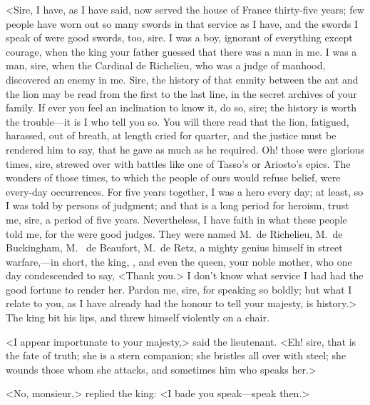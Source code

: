 <Sire, I have, as I have said, now served the house of France thirty-five years; few people have worn out so many swords in that service as I have, and the swords I speak of were good swords, too, sire. I was a boy, ignorant of everything except courage, when the king your father guessed that there was a man in me. I was a man, sire, when the Cardinal de Richelieu, who was a judge of manhood, discovered an enemy in me. Sire, the history of that enmity between the ant and the lion may be read from the first to the last line, in the secret archives of your family. If ever you feel an inclination to know it, do so, sire; the history is worth the trouble—it is I who tell you so. You will there read that the lion, fatigued, harassed, out of breath, at length cried for quarter, and the justice must be rendered him to say, that he gave as much as he required. Oh! those were glorious times, sire, strewed over with battles like one of Tasso's or Ariosto's epics. The wonders of those times, to which the people of ours would refuse belief, were every-day occurrences. For five years together, I was a hero every day; at least, so I was told by persons of judgment; and that is a long period for heroism, trust me, sire, a period of five years. Nevertheless, I have faith in what these people told me, for the were good judges. They were named M.~de Richelieu, M.~de Buckingham, M.~ de Beaufort, M.~de Retz, a mighty genius himself in street warfare,—in short, the king, , and even the queen, your noble mother, who one day condescended to say, <Thank you.> I don't know what service I had had the good fortune to render her. Pardon me, sire, for speaking so boldly; but what I relate to you, as I have already had the honour to tell your majesty, is history.> The king bit his lips, and threw himself violently on a chair.

<I appear importunate to your majesty,> said the lieutenant. <Eh! sire, that is the fate of truth; she is a stern companion; she bristles all over with steel; she wounds those whom she attacks, and sometimes him who speaks her.>

<No, monsieur,> replied the king: <I bade you speak—speak then.>

